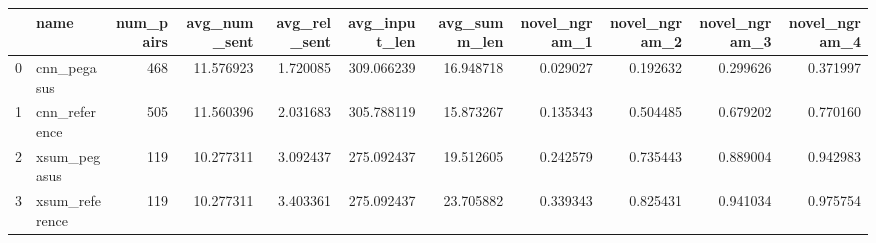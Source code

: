 \begin{tabular}{llrrrrrrrrr}
\toprule
{} &            name &  num\_pairs &  avg\_num\_sent &  avg\_rel\_sent &  avg\_input\_len &  avg\_summ\_len &  novel\_ngram\_1 &  novel\_ngram\_2 &  novel\_ngram\_3 &  novel\_ngram\_4 \\
\midrule
0 &     cnn\_pegasus &        468 &     11.576923 &      1.720085 &     309.066239 &     16.948718 &       0.029027 &       0.192632 &       0.299626 &       0.371997 \\
1 &   cnn\_reference &        505 &     11.560396 &      2.031683 &     305.788119 &     15.873267 &       0.135343 &       0.504485 &       0.679202 &       0.770160 \\
2 &    xsum\_pegasus &        119 &     10.277311 &      3.092437 &     275.092437 &     19.512605 &       0.242579 &       0.735443 &       0.889004 &       0.942983 \\
3 &  xsum\_reference &        119 &     10.277311 &      3.403361 &     275.092437 &     23.705882 &       0.339343 &       0.825431 &       0.941034 &       0.975754 \\
\bottomrule
\end{tabular}
